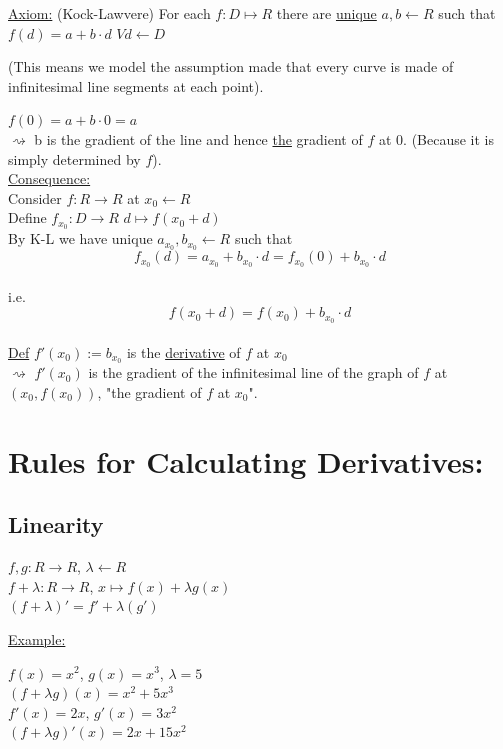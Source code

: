 \documentclass[a4paper, 12pt]{article}
\begin{document}
\underline{Axiom:} (Kock-Lawvere) For each $f: D\mapsto R$ there are \underline{unique} $a,b \leftarrow R$ such that $f(d) = a +b \cdot d$ $ Vd \leftarrow D$
\begin{multicols}{2}
(This means we model the assumption made that every curve is made of infinitesimal line segments at each point).
\end{multicols}
$f(0) = a+b \cdot 0 = a$\\
$\rightsquigarrow$ b is the gradient of the line and hence \underline{the} gradient of $f$ at $0$. (Because it is simply determined by $f$).\\
\underline{Consequence:}\\
Consider $f:R\rightarrow R$ at $x_0 \leftarrow R$\\
Define $f_{x_0} : D\rightarrow R$ $d\mapsto f(x_0 + d)$\\
By K-L we have unique $a_{x_0}, b_{x_0} \leftarrow R$ such that \\
$$f_{x_0}(d) = a_{x_0}+b_{x_0} \cdot d =  f_{x_0}(0) + b_{x_0} \cdot d$$\\
i.e. $$f(x_0 + d) = f(x_0) + b_{x_0} \cdot d$$\\
\underline{Def} $f'(x_0) := b_{x_0}$ is the \underline{derivative} of $f$ at $x_0$\\
$\rightsquigarrow$ $f'(x_0)$ is the gradient of the infinitesimal line of the graph of $f$ at $(x_0,f(x_0))$, "the gradient of $f$ at $x_0$".\\

\section{Rules for Calculating Derivatives:}
\subsection{Linearity}
\begin{center}
$f,g : R \rightarrow R$, $\lambda \leftarrow R$\\
$f + \lambda : R \rightarrow R$, $ x \mapsto f(x) + \lambda g(x)$\\
$(f + \lambda)' = f' + \lambda(g')$\\
\end{center}
\underline{Example:}\\
\begin{center}
$f(x) = x^2$, $g(x) = x^3$, $\lambda = 5$\\
$(f+\lambda g)(x) = x^2 + 5x^3$\\
$f'(x) = 2x$, $g'(x) = 3x^2$\\
$(f+\lambda g)'(x) = 2x + 15x^2$\\
\end{center}
\end{document}
